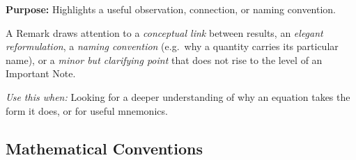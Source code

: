 \bigskip

\noindent
\begin{minipage}{0.9\textwidth}
  \begin{remark}
    \textbf{Purpose:} Highlights a useful observation, connection, or naming convention.

    A Remark draws attention to a \emph{conceptual link} between results, an
    \emph{elegant reformulation}, a \emph{naming convention} (e.g.\ why a quantity
    carries its particular name), or a \emph{minor but clarifying point} that does
    not rise to the level of an Important Note.

    \smallskip
    \textit{Use this when:} Looking for a deeper understanding of why an equation
    takes the form it does, or for useful mnemonics.
  \end{remark}
\end{minipage}


\clearpage
\subsection*{Mathematical Conventions}





